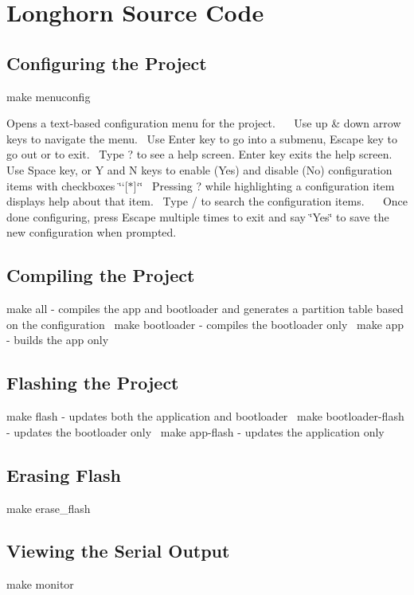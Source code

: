 \hypertarget{index_sub1}{}\section{Longhorn Source Code}\label{index_sub1}
\hypertarget{index_sub2}{}\subsection{Configuring the Project}\label{index_sub2}
make menuconfig

Opens a text-\/based configuration menu for the project.~\newline
~\newline
 Use up \& down arrow keys to navigate the menu.~\newline
 Use Enter key to go into a submenu, Escape key to go out or to exit.~\newline
 Type ? to see a help screen. Enter key exits the help screen.~\newline
 Use Space key, or Y and N keys to enable (Yes) and disable (No) configuration items with checkboxes \char`\"{}`\mbox{[}$\ast$\mbox{]}`\char`\"{}~\newline
 Pressing ? while highlighting a configuration item displays help about that item.~\newline
 Type / to search the configuration items.~\newline
~\newline
 Once done configuring, press Escape multiple times to exit and say \char`\"{}\+Yes\char`\"{} to save the new configuration when prompted.\hypertarget{index_sub3}{}\subsection{Compiling the Project}\label{index_sub3}
make all -\/ compiles the app and bootloader and generates a partition table based on the configuration~\newline
 make bootloader -\/ compiles the bootloader only~\newline
 make app -\/ builds the app only~\newline
 \hypertarget{index_sub4}{}\subsection{Flashing the Project}\label{index_sub4}
make flash -\/ updates both the application and bootloader~\newline
 make bootloader-\/flash -\/ updates the bootloader only~\newline
 make app-\/flash -\/ updates the application only~\newline
\hypertarget{index_sub5}{}\subsection{Erasing Flash}\label{index_sub5}
make erase\+\_\+flash\hypertarget{index_sub6}{}\subsection{Viewing the Serial Output}\label{index_sub6}
make monitor 